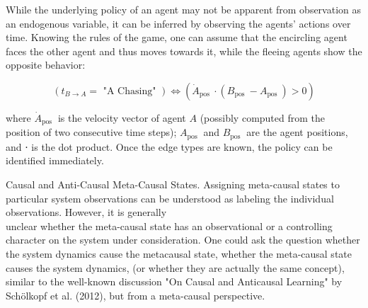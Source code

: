 \documentclass[10pt]{article}
\begin{document}
While the underlying policy of an agent may not be apparent from observation as an endogenous variable, it can be inferred by observing the agents' actions over time. Knowing the rules of the game, one can assume that the encircling agent faces the other agent and thus moves towards it, while the fleeing agents show the opposite behavior:

$$
\left(t_{B \rightarrow A}=\text { "A Chasing" }\right) \Longleftrightarrow\left(\dot{A}_{\text {pos }} \cdot\left(B_{\text {pos }}-A_{\text {pos }}\right)>0\right)
$$

where $\dot{A}_{\text {pos }}$ is the velocity vector of agent $A$ (possibly computed from the position of two consecutive time steps); $A_{\text {pos }}$ and $B_{\text {pos }}$ are the agent positions, and ⋅ is the dot product. Once the edge types are known, the policy can be identified immediately.

Causal and Anti-Causal Meta-Causal States. Assigning meta-causal states to particular system observations can be understood as labeling the individual observations. However, it is generally\\
unclear whether the meta-causal state has an observational or a controlling character on the system under consideration. One could ask the question whether the system dynamics cause the metacausal state, whether the meta-causal state causes the system dynamics, (or whether they are actually the same concept), similar to the well-known discussion "On Causal and Anticausal Learning" by Schölkopf et al. (2012), but from a meta-causal perspective.
\end{document}

